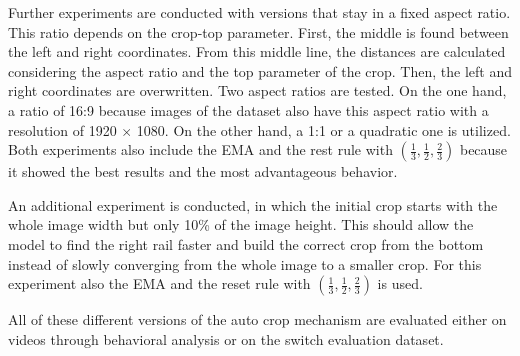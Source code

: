 Further experiments are conducted with versions that stay in a fixed aspect ratio.
This ratio depends on the crop-top parameter.
First, the middle is found between the left and right coordinates.
From this middle line, the distances are calculated considering the aspect ratio and the top parameter of the crop.
Then, the left and right coordinates are overwritten.
Two aspect ratios are tested.
On the one hand, a ratio of 16:9 because images of the dataset also have this aspect ratio with a resolution of 1920 $\times$ 1080.
On the other hand, a 1:1 or a quadratic one is utilized.
Both experiments also include the \ac{EMA} and the rest rule with $(\frac{1}{3}, \frac{1}{2}, \frac{2}{3})$ because it showed the best results and the most advantageous behavior.

An additional experiment is conducted, in which the initial crop starts with the whole image width but only 10\% of the image height.
This should allow the model to find the right rail faster and build the correct crop from the bottom instead of slowly converging from the whole image to a smaller crop.
For this experiment also the \ac{EMA} and the reset rule with $(\frac{1}{3}, \frac{1}{2}, \frac{2}{3})$ is used.

All of these different versions of the auto crop mechanism are evaluated either on videos through behavioral analysis or on the switch evaluation dataset.

